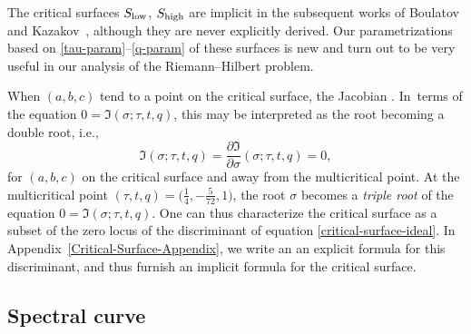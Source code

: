 \documentclass[10pt,a4paper]{amsart}
\numberwithin{equation}{section}
\begin{document}
The critical surfaces $S_{{\rm low}}$, $S_{{\rm high}}$ are implicit in the subsequent works of Boulatov and Kazakov~\cite{Kazakov2}, although they are never explicitly derived. Our parametrizations based on \eqref{tau-param}--\eqref{q-param} of these surfaces is new and turn out to be very useful in our analysis of the Riemann--Hilbert problem.



\begin{Remark}
When $(a,b,c)$ tend to a point on the critical surface, the Jacobian
 . In~terms of the equation $0 = \mathfrak{I}(\sigma;\tau,t,q)$, this may be interpreted as the root  becoming a double root, i.e.,
 \begin{equation*}
 \mathfrak{I}(\sigma;\tau,t,q) = \frac{\partial \mathfrak{I} }{\partial \sigma}(\sigma;\tau,t,q) = 0,
 \end{equation*}
 for $(a,b,c)$ on the critical surface and away from the multicritical point. At the multicritical point $(\tau,t,q) = \bigl(\frac{1}{4},-\frac{5}{72},1\bigr)$, the
 root $\sigma$ becomes a \textit{triple root} of the equation $0 = \mathfrak{I}(\sigma;\tau,t,q)$. One can thus characterize the critical surface as a subset of the zero locus of the discriminant of equation \eqref{critical-surface-ideal}. In Appendix~\ref{Critical-Surface-Appendix}, we write an
 an explicit formula for this discriminant, and thus furnish an implicit formula for the critical surface.
\end{Remark}




 \subsection{Spectral curve}
\end{document}
